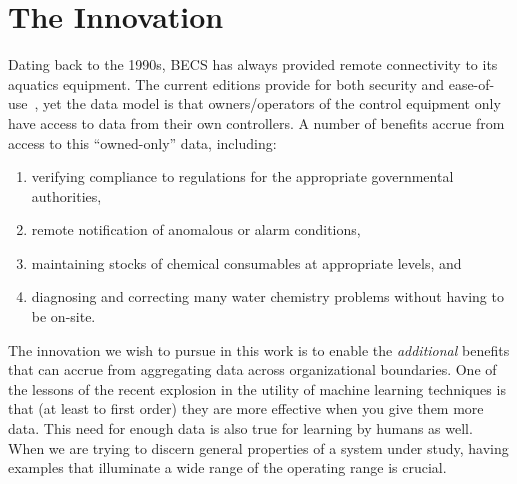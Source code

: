 \section{The Innovation}
\label{sec:innovation}

%

Dating back to the 1990s, BECS has always provided remote connectivity
to its aquatics equipment.  The current editions provide for both
security and ease-of-use~\cite{ccgss16,ccgss18}, yet the data model
is that owners/operators of the control equipment only have access to
data from their own controllers.
A number of benefits accrue from access to this ``owned-only'' data,
including:
\begin{enumerate}
\item verifying compliance to regulations for the appropriate
governmental authorities,
\item remote notification of anomalous or alarm conditions,
\item maintaining stocks of chemical consumables at appropriate levels, and
\item diagnosing and correcting many water chemistry problems without
having to be on-site.
\end{enumerate}

The innovation we wish to pursue in this work is to enable
the \emph{additional} benefits that can accrue from aggregating data
across organizational boundaries.
One of the lessons of the recent explosion in the utility of machine
learning techniques is that (at least to first order) they are more
effective when you give them more data.  This need for enough data is
also true for learning by humans as well.  When we are trying to discern
general properties of a system under study, having examples that
illuminate a wide range of the operating range is crucial.

